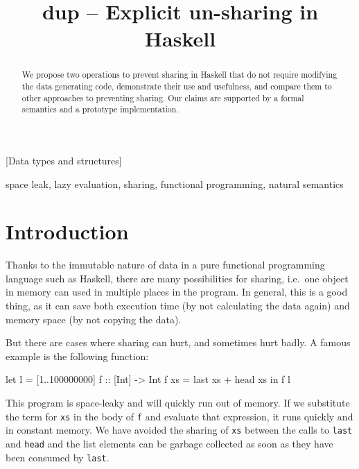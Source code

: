 \documentclass[preprint]{sigplanconf}
\title{dup -- Explicit un-sharing in Haskell}
\theoremstyle{nonumberplain}
\newcommand{\li}{\lstinline[style=Haskell]}
\begin{document}
\maketitle

\begin{abstract}
We propose two operations to prevent sharing in Haskell that do not require modifying the data generating code, demonstrate their use and usefulness, and compare them to other approaches to preventing sharing. Our claims are supported by a formal semantics and a prototype implementation.
\end{abstract}


[Data types and structures]

\keywords space leak, lazy evaluation, sharing, functional programming, natural semantics


\section{Introduction}

Thanks to the immutable nature of data in a pure functional programming language such as Haskell, there are many possibilities for sharing, i.e.\ one object in memory can used in multiple places in the program. In general, this is a good thing, as it can save both execution time (by not calculating the data again) and memory space (by not copying the data).

But there are cases where sharing can hurt, and sometimes hurt badly. A famous example is the following function:
\begin{haskell}
let l = [1..100000000]
    f :: [Int] -> Int
    f xs = last xs + head xs
in  f l
\end{haskell}
This program is space-leaky and will quickly run out of memory. If we substitute the term for \li-xs- in the body of \li-f- and evaluate that expression, it runs quickly and in constant memory. We have avoided the sharing of \li-xs- between the calls to \li-last- and \li-head- and the list elements can be garbage collected as soon as they have been consumed by \li-last-.
\end{document}
